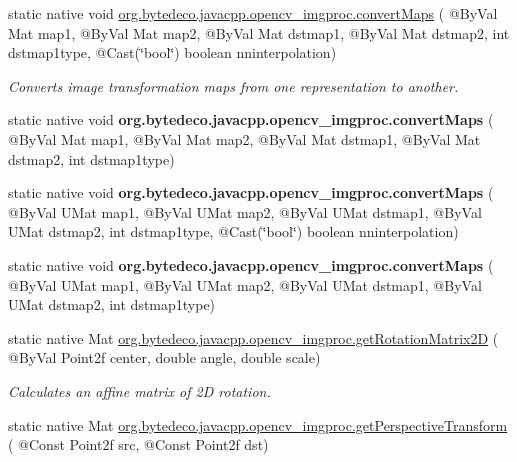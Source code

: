 \begin{DoxyCompactItemize}
static native void \hyperlink{group__imgproc__transform_ga5c40c7a1051387a05e1e30b6aaa6dbfd}{org.\+bytedeco.\+javacpp.\+opencv\+\_\+imgproc.\+convert\+Maps} ( @By\+Val Mat map1, @By\+Val Mat map2, @By\+Val Mat dstmap1, @By\+Val Mat dstmap2, int dstmap1type, @Cast(\char`\"{}bool\char`\"{}) boolean nninterpolation)
\begin{DoxyCompactList}\small\item\em Converts image transformation maps from one representation to another. \end{DoxyCompactList}\item 
\mbox{\label{group__imgproc__transform_ga38edfd4eb9350c8624f9ac8d6c5a2105}} 
static native void {\bfseries org.\+bytedeco.\+javacpp.\+opencv\+\_\+imgproc.\+convert\+Maps} ( @By\+Val Mat map1, @By\+Val Mat map2, @By\+Val Mat dstmap1, @By\+Val Mat dstmap2, int dstmap1type)
\item 
\mbox{\label{group__imgproc__transform_gacc7ce32b309a532e190b87698e607bc5}} 
static native void {\bfseries org.\+bytedeco.\+javacpp.\+opencv\+\_\+imgproc.\+convert\+Maps} ( @By\+Val U\+Mat map1, @By\+Val U\+Mat map2, @By\+Val U\+Mat dstmap1, @By\+Val U\+Mat dstmap2, int dstmap1type, @Cast(\char`\"{}bool\char`\"{}) boolean nninterpolation)
\item 
\mbox{\label{group__imgproc__transform_ga4116bc34873bc0b9ceaf283ac1ef5b0f}} 
static native void {\bfseries org.\+bytedeco.\+javacpp.\+opencv\+\_\+imgproc.\+convert\+Maps} ( @By\+Val U\+Mat map1, @By\+Val U\+Mat map2, @By\+Val U\+Mat dstmap1, @By\+Val U\+Mat dstmap2, int dstmap1type)
\item 
static native Mat \hyperlink{group__imgproc__transform_gab3d97da00a90c299d2899587dc60c4cd}{org.\+bytedeco.\+javacpp.\+opencv\+\_\+imgproc.\+get\+Rotation\+Matrix2D} ( @By\+Val Point2f center, double angle, double scale)
\begin{DoxyCompactList}\small\item\em Calculates an affine matrix of 2D rotation. \end{DoxyCompactList}\item 
static native Mat \hyperlink{group__imgproc__transform_ga9c65e08c8634d7f7d24ab403dac41b26}{org.\+bytedeco.\+javacpp.\+opencv\+\_\+imgproc.\+get\+Perspective\+Transform} ( @Const Point2f src, @Const Point2f dst)
\item 

\end{DoxyCompactItemize}
